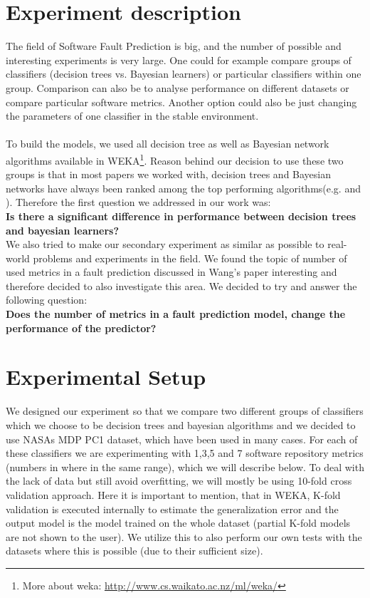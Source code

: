 \section{Experiment description}
The field of Software Fault Prediction is big, and the number of possible and interesting experiments is very large. One could for example compare groups of classifiers (decision trees vs. Bayesian learners) or particular classifiers within one group. Comparison can also be to analyse performance on different datasets or compare particular software metrics. Another option could also be just changing the parameters of one classifier in the stable environment.\\\\
To build the models, we used all decision tree as well as Bayesian network algorithms available in WEKA\footnote{More about weka: \url{http://www.cs.waikato.ac.nz/ml/weka/}}. Reason behind our decision to use these two groups is that in most papers we worked with, decision trees and Bayesian networks have always been ranked among the top performing algorithms(e.g. \cite{malhotra2015systematic} and \cite{shivaji2009reducing}). Therefore the first question we addressed in our work was: \\
\textbf{Is there a significant difference in performance between decision trees and bayesian learners?}\\
We also tried to make our secondary experiment as similar as possible to real-world problems and experiments in the field. We found the topic of number of used metrics in a fault prediction discussed in Wang's paper\cite{wang2011many} interesting and therefore decided to also investigate this area. We decided to try and answer the following question:\\
\textbf{Does the number of metrics in a fault prediction model, change the performance of the predictor?}
\section{Experimental Setup}
We designed our experiment so that we compare two different groups of classifiers which we choose to be decision trees and bayesian algorithms and we decided to use NASAs MDP PC1 dataset, which have been used in many cases. For each of these classifiers we are experimenting with 1,3,5 and 7 software repository metrics (numbers in \cite{wang2011many} where in the same range), which we will describe below. To deal with the lack of data but still avoid overfitting, we will mostly be using 10-fold cross validation approach. Here it is important to mention, that in WEKA, K-fold validation is executed internally to estimate the generalization error and the output model is the model trained on the whole dataset (partial K-fold models are not shown to the user). We utilize this to also perform our own tests with the datasets where this is possible (due to their sufficient size).
